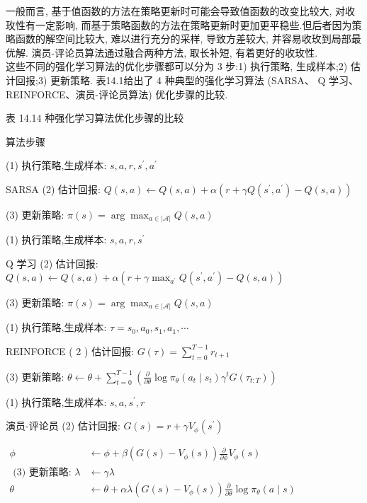 \documentclass[10pt]{article}
\begin{document}
一般而言, 基于值函数的方法在策略更新时可能会导致值函数的改变比较大, 对收玫性有一定影响, 而基于策略函数的方法在策略更新时更加更平稳些.但后者因为策略函数的解空间比较大, 难以进行充分的采样, 导致方差较大, 并容易收玫到局部最优解. 演员-评论员算法通过融合两种方法, 取长补短, 有着更好的收玫性.\\
这些不同的强化学习算法的优化步骤都可以分为 3 步:1) 执行策略, 生成样本;2) 估计回报;3) 更新策略. 表14.1给出了 4 种典型的强化学习算法 (SARSA、 $\mathrm{Q}$ 学习、REINFORCE、演员-评论员算法) 优化步骤的比较.

表 14.14 种强化学习算法优化步骤的比较

算法步骤

(1) 执行策略,生成样本: $s, a, r, s^{\prime}, a^{\prime}$

SARSA (2) 估计回报: $Q(s, a) \leftarrow Q(s, a)+\alpha\left(r+\gamma Q\left(s^{\prime}, a^{\prime}\right)-Q(s, a)\right)$

(3) 更新策略: $\pi(s)=\arg \max _{a \in|\mathcal{A}|} Q(s, a)$

(1) 执行策略,生成样本: $s, a, r, s^{\prime}$

Q 学习 (2) 估计回报: $Q(s, a) \leftarrow Q(s, a)+\alpha\left(r+\gamma \max _{a^{\prime}} Q\left(s^{\prime}, a^{\prime}\right)-Q(s, a)\right)$

(3) 更新策略: $\pi(s)=\arg \max _{a \in|\mathcal{A}|} Q(s, a)$

(1) 执行策略,生成样本: $\tau=s_{0}, a_{0}, s_{1}, a_{1}, \cdots$

REINFORCE ( 2 ) 估计回报: $G(\tau)=\sum_{t=0}^{T-1} r_{t+1}$

(3) 更新策略: $\theta \leftarrow \theta+\sum_{t=0}^{T-1}\left(\frac{\partial}{\partial \theta} \log \pi_{\theta}\left(a_{t} \mid s_{t}\right) \gamma^{t} G\left(\tau_{t: T}\right)\right)$

(1) 执行策略,生成样本: $s, a, s^{\prime}, r$

演员-评论员 (2) 估计回报: $G(s)=r+\gamma V_{\phi}\left(s^{\prime}\right)$

$\begin{aligned} \phi & \leftarrow \phi+\beta\left(G(s)-V_{\phi}(s)\right) \frac{\partial}{\partial \phi} V_{\phi}(s) \\ \text { (3) 更新策略: } \lambda & \leftarrow \gamma \lambda \\ \theta & \leftarrow \theta+\alpha \lambda\left(G(s)-V_{\phi}(s)\right) \frac{\partial}{\partial \theta} \log \pi_{\theta}(a \mid s)\end{aligned}$
\end{document}
